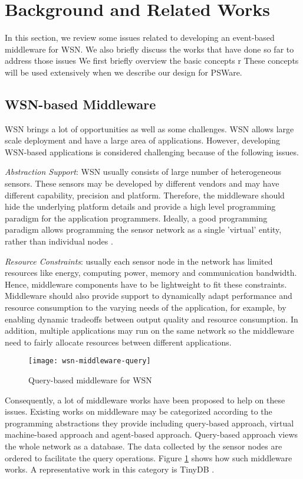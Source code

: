 \section{Background and Related Works}
\label{sec:background}
In this section, we review some issues related to developing an event-based middleware for WSN. We also briefly discuss the works that have done so far to address those issues
We first briefly overview the basic concepts r These concepts will be used extensively when we describe our design for PSWare.

\subsection{WSN-based Middleware}
WSN brings a lot of opportunities as well as some challenges. WSN allows large scale deployment and have a large area of applications. However, developing WSN-based applications is considered challenging because of the following issues.

\emph{Abstraction Support}: WSN usually consists of large number of heterogeneous sensors. These sensors may be developed by different vendors and may have different capability, precision and platform. Therefore, the middleware should hide the underlying platform details and provide a high level programming paradigm for the application programmers. Ideally, a good programming paradigm allows programming the sensor network as a single 'virtual' entity, rather than individual nodes \cite{programmingparadigms}.

\emph{Resource Constraints}: usually each sensor node in the network has limited resources like energy, computing power, memory and communication bandwidth. Hence, middleware components have to be lightweight to fit these constraints. Middleware should also provide support to dynamically adapt performance and resource consumption to the varying needs of the application, for example, by enabling dynamic tradeoffs between output quality and resource consumption. In addition, multiple applications may run on the same network so the middleware need to fairly allocate resources between different applications.

\begin{figure}
\centering
\texttt{[image: wsn-middleware-query]}
\caption{Query-based middleware for WSN}
\label{fig:wsn-middleware-query}
\end{figure}

Consequently, a lot of middleware works have been proposed to help on these issues. Existing works on middleware may be categorized according to the programming abstractions they provide including query-based approach, virtual machine-based approach and agent-based approach. Query-based approach views the whole network as a database. The data collected by the sensor nodes are ordered to facilitate the query operations. Figure \ref{fig:wsn-middleware-query} shows how such middleware works. A representative work in this category is TinyDB \cite{tinydb}.

